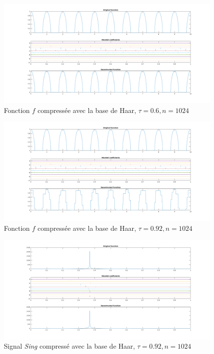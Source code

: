 \documentclass[a4paper,12pt, openany]{book}
\theoremstyle{break}
\begin{document}
\begin{figure}[H]
  \includegraphics[width=\textwidth]{compressHaar1024points_taux0_6}
  \caption{Fonction $f$ compressée avec la base de Haar, $\tau=0.6, n=1024$}
\end{figure}

\begin{figure}[H]
  \includegraphics[width=\textwidth]{compressHaar1024points_taux0_92}
  \caption{Fonction $f$ compressée avec la base de Haar, $\tau=0.92, n=1024$}
\end{figure}

\begin{figure}[H]
  \includegraphics[width=\textwidth]{Sing_compression0_92Haar}
  \caption{Signal \textit{Sing} compressé avec la base de Haar, $\tau=0.92, n=1024$}
\end{figure}
\end{document}
